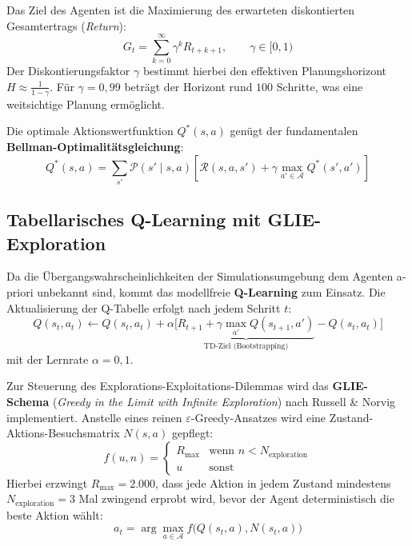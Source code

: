 \documentclass[11pt,a4paper]{article}
\begin{document}
Das Ziel des Agenten ist die Maximierung des erwarteten diskontierten Gesamtertrags (\textit{Return}):
\begin{equation}
  G_t = \sum_{k=0}^{\infty} \gamma^k R_{t+k+1}, \qquad \gamma \in [0, 1)
\end{equation}
Der Diskontierungsfaktor $\gamma$ bestimmt hierbei den effektiven Planungshorizont $H \approx \frac{1}{1-\gamma}$. Für $\gamma = 0{,}99$ beträgt der Horizont rund $100$ Schritte, was eine weitsichtige Planung ermöglicht.

Die optimale Aktionswertfunktion $Q^*(s, a)$ genügt der fundamentalen \textbf{Bellman-Optimalitätsgleichung}:
\begin{equation}
  Q^*(s, a) = \sum_{s'} \mathcal{P}(s' \mid s, a) \left[ \mathcal{R}(s, a, s') + \gamma \max_{a' \in \mathcal{A}} Q^*(s', a') \right]
\end{equation}

\subsection{Tabellarisches Q-Learning mit GLIE-Exploration}
Da die Übergangswahrscheinlichkeiten der Simulationsumgebung dem Agenten a-priori unbekannt sind, kommt das modellfreie \textbf{Q-Learning} zum Einsatz. Die Aktualisierung der Q-Tabelle erfolgt nach jedem Schritt $t$:
\begin{equation}
  Q(s_t, a_t) \leftarrow Q(s_t, a_t) + \alpha \Big[ \underbrace{R_{t+1} + \gamma \max_{a'} Q(s_{t+1}, a')}_{\text{TD-Ziel (Bootstrapping)}} - Q(s_t, a_t) \Big]
  \label{eq:q_update}
\end{equation}
mit der Lernrate $\alpha = 0{,}1$. 

Zur Steuerung des Explorations-Exploitations-Dilemmas wird das \textbf{GLIE-Schema} (\textit{Greedy in the Limit with Infinite Exploration}) nach Russell \& Norvig implementiert. Anstelle eines reinen $\varepsilon$-Greedy-Ansatzes wird eine Zustand-Aktions-Besuchsmatrix $N(s, a)$ gepflegt:
\begin{equation}
  f(u, n) = \begin{cases}
    R_{\max} & \text{wenn } n < N_{\text{exploration}} \\
    u & \text{sonst}
  \end{cases}
\end{equation}
Hierbei erzwingt $R_{\max} = 2.000$, dass jede Aktion in jedem Zustand mindestens $N_{\text{exploration}} = 3$ Mal zwingend erprobt wird, bevor der Agent deterministisch die beste Aktion wählt:
\begin{equation}
  a_t = \arg\max_{a \in \mathcal{A}} f\big(Q(s_t, a), N(s_t, a)\big)
\end{equation}
\end{document}
